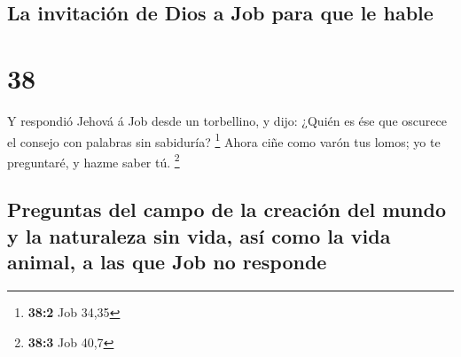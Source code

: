 \hypertarget{la-invitaciuxf3n-de-dios-a-job-para-que-le-hable}{%
\subsection{La invitación de Dios a Job para que le
hable}\label{la-invitaciuxf3n-de-dios-a-job-para-que-le-hable}}

\hypertarget{section-37}{%
\section{38}\label{section-37}}

 Y respondió Jehová á Job desde un torbellino, y dijo:
 ¿Quién es ése que oscurece el consejo con palabras sin
sabiduría? \footnote{\textbf{38:2} Job 34,35}  Ahora ciñe
como varón tus lomos; yo te preguntaré, y hazme saber tú. \footnote{\textbf{38:3}
  Job 40,7}

\hypertarget{preguntas-del-campo-de-la-creaciuxf3n-del-mundo-y-la-naturaleza-sin-vida-asuxed-como-la-vida-animal-a-las-que-job-no-responde}{%
\subsection{Preguntas del campo de la creación del mundo y la naturaleza
sin vida, así como la vida animal, a las que Job no
responde}\label{preguntas-del-campo-de-la-creaciuxf3n-del-mundo-y-la-naturaleza-sin-vida-asuxed-como-la-vida-animal-a-las-que-job-no-responde}}

